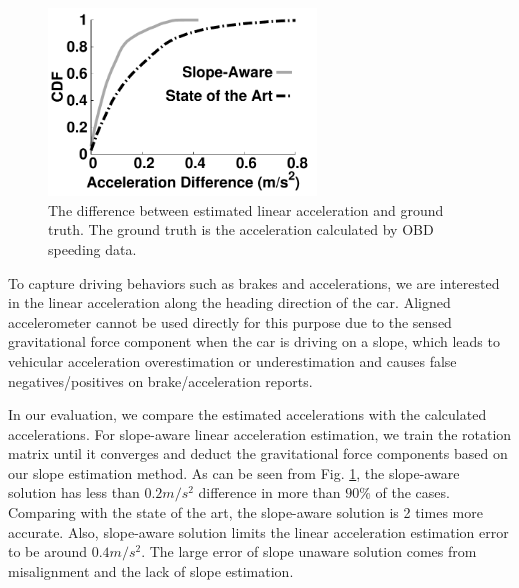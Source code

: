 \begin{figure}[!htbp]
\begin{center}
\includegraphics[width=2.8in,angle=0]{Figs/SlopeAware/accdifference.pdf}
\vspace{0.0cm}
\caption{The difference between estimated linear acceleration and ground truth. 
The ground truth is the acceleration calculated by OBD speeding data.}
\label{accdifference}
\vspace{-0.2cm}
\end{center}
\end{figure}


To capture driving behaviors such as brakes and accelerations, 
we are interested in the linear acceleration along the heading
direction of the car. 
Aligned accelerometer cannot be used directly for this purpose
due to the sensed gravitational force component when the car is 
driving on a slope, which leads to vehicular acceleration 
overestimation or underestimation and causes false negatives/positives
on brake/acceleration reports. 

In our evaluation, we compare the estimated accelerations with the calculated
accelerations. 
For slope-aware linear acceleration estimation, we train the rotation matrix
until it converges and deduct the gravitational force components based
on our slope estimation method.
As can be seen from Fig. \ref{accdifference}, the slope-aware solution
has less than $0.2m/s^2$ difference in more than $90\%$ of the cases. 
Comparing with the state of the art, the slope-aware solution is 2 times 
more accurate. 
Also, slope-aware solution limits the linear 
acceleration estimation error to be around $0.4m/s^2$.
The large error of slope unaware solution comes from misalignment
and the lack of slope estimation. 

 

